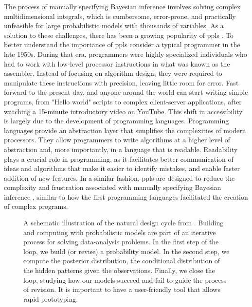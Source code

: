 The process of manually specifying Bayesian inference involves solving complex
multidimensional integrals, which is cumbersome, error-prone, and practically unfeasible for
large probabilistic models with thousands of variables.
As a solution to these challenges, there has been a growing popularity of \acp{ppl} \citep{van_de_meent_introduction_2021}.
To better understand the importance of \acp{ppl} consider a typical programmer in the late 1950s.
During that era, programmers were highly specialized individuals who had to work with
low-level processor instructions in what was known as the assembler.
Instead of focusing on algorithm design, they were required to manipulate these instructions
with precision, leaving little room for error.
Fast forward to the present day, and anyone around the world can start writing simple
programs, from "Hello world" scripts to complex client-server applications, after watching a
15-minute introductory video on YouTube.
This shift in accessibility is largely due to the development of programming languages.
Programming languages provide an abstraction layer that simplifies the complexities of modern
processors.
They allow programmers to write algorithms at a higher level of abstraction and, more
importantly, in a language that is readable.
Readability plays a crucial role in programming, as it facilitates better communication of
ideas and algorithms that make it easier to identify mistakes, and enable faster addition of new
features.
In a similar fashion, \Acp{ppl} are designed to reduce the complexity and frustration associated with manually specifying
Bayesian inference \citep{carpenter_stan:_2017, van_de_laar_forneylab:_2018, ge_turing_2018, pmlr-v138-tehrani20a, JASP2023}, similar to how the first programming languages facilitated the creation of complex programs. 

\begin{figure}
  \centering
  \resizebox{0.5\textwidth}{!}{}
  \caption{A schematic illustration of the natural design cycle from \citep{blei_build_2014}. Building and computing with probabilistic models are part of an iterative process for solving data-analysis problems. 
  In the first step of the loop, we build (or revise) a probability model. In the second step, we compute the posterior distribution, the conditional distribution of the hidden patterns given the observations. Finally, we close the loop, studying how our models succeed and fail to guide the process of revision. It is important to have a user-friendly tool that allows rapid prototyping.}
  \label{fig:intro:prototype-loop}
\end{figure}

